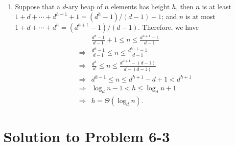 \documentclass[a4paper, fleqn]{article}
\begin{document}
\begin{enumerate}
\renewcommand{\labelenumi}{\itshape \bfseries \alph{enumi}.}
\item  %
Suppose that a $d$-ary heap of $n$ elements has height $h$, then $n$ is at least 
$1 + d + \cdots + d^{h-1} + 1 = (d^h - 1)/(d - 1) + 1$; and $n$ is at most $1 + 
d + \cdots + d^h = (d^{h+1} - 1)/(d - 1)$. Therefore, we have
\begin{eqnarray*}
& & \frac{d^h - 1}{d - 1} + 1 \leq n \leq \frac{d^{h+1} - 1}{d - 1} \\
& \Rightarrow & \frac{d^h - 1}{d - 1} \leq n \leq \frac{d^{h+1} - 1}{d - 1} \\
& \Rightarrow & \frac{d^h}{d} \leq n \leq \frac{d^{h+1}-(d-1)}{d-(d-1)} \\
& \Rightarrow & d^{h-1} \leq n \leq d^{h+1}-d+1 < d^{h+1} \\
& \Rightarrow & \log_d n - 1 < h \leq \log_d n + 1 \\
& \Rightarrow & h = \Theta(\log_d n).
\end{eqnarray*}
\end{enumerate}







\section*{Solution to Problem 6-3}
\end{document}
